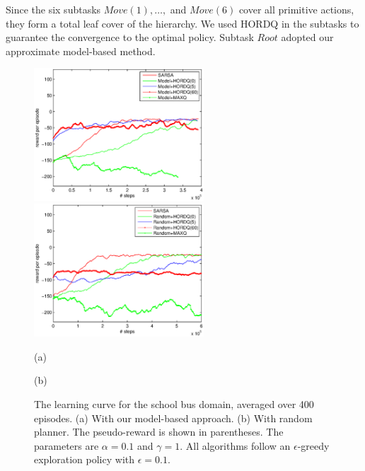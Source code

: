 Since the six subtasks $Move(1), \dots,$ and $Move(6)$ cover all primitive actions, they form a total leaf cover of the hierarchy.
We used HORDQ in the subtasks to guarantee the convergence to the optimal
policy. Subtask $Root$ adopted our approximate model-based method. 


\begin{figure}[t]
 \begin{minipage}[b]{0.5\linewidth}
     \begin{center}
    \includegraphics[width=2.5in] {./figures/Approx.eps}
\end{center}
\end{minipage}
\begin{minipage}[b]{0.5\linewidth}
     \begin{center}
    \includegraphics[width=2.5in] {./figures/Random.eps}
\end{center}
\end{minipage}
\begin{minipage}[b]{0.5\linewidth} \centering (a) \end{minipage}
\begin{minipage}[b]{0.5\linewidth} \centering (b) \end{minipage}

\caption{The learning curve for the school bus domain, averaged over 400 episodes. (a) With our model-based approach. (b) With random planner.
The pseudo-reward is shown in parentheses. The parameters are $\alpha=0.1$ and $\gamma=1$. All algorithms follow an $\epsilon$-greedy exploration policy
with $\epsilon = 0.1$.}
\label{fig:res}
\end{figure}

